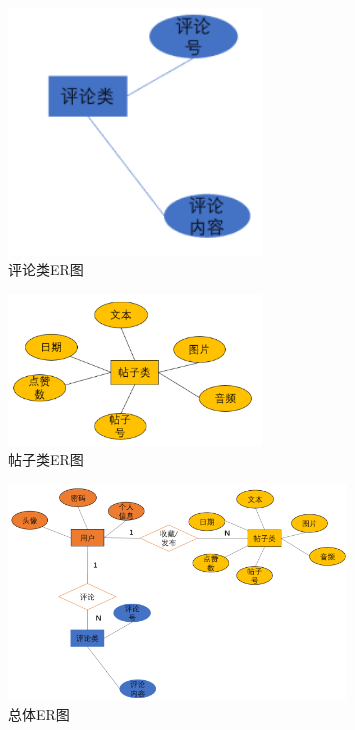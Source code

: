 \begin{figure}[H]
    \centering
    \includegraphics[width=0.6\textwidth]{figures/ER2.png}
    \caption{评论类ER图}
    \label{fig:my_label}
\end{figure}

\begin{figure}[H]
    \centering
    \includegraphics[width=0.6\textwidth]{figures/ER3.png}
    \caption{帖子类ER图}
    \label{fig:my_label}
\end{figure}

\begin{figure}[H]
    \centering
    \includegraphics[width=0.8\textwidth]{figures/ER4.png}
    \caption{总体ER图}
    \label{fig:my_label}
\end{figure}
